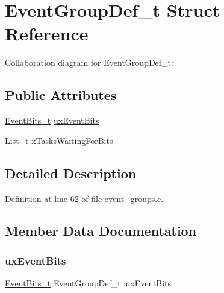 \hypertarget{struct_event_group_def__t}{}\section{Event\+Group\+Def\+\_\+t Struct Reference}
\label{struct_event_group_def__t}


Collaboration diagram for Event\+Group\+Def\+\_\+t\+:
\subsection*{Public Attributes}
\begin{DoxyCompactItemize}
\item 
\hyperlink{externals_2freertos_2include_2event__groups_8h_ab2f21b93db0b2a0ab64d7a81ff32ac2e}{Event\+Bits\+\_\+t} \hyperlink{struct_event_group_def__t_ab1bcd95a3330b71c55198b2352926643}{ux\+Event\+Bits}
\item 
\hyperlink{externals_2freertos_2include_2list_8h_afd590ef6400071b4d63d65ef90bea7f4}{List\+\_\+t} \hyperlink{struct_event_group_def__t_a3dd347560456bfe452415efb52760dc3}{x\+Tasks\+Waiting\+For\+Bits}
\end{DoxyCompactItemize}


\subsection{Detailed Description}


Definition at line 62 of file event\+\_\+groups.\+c.



\subsection{Member Data Documentation}
\mbox{\label{struct_event_group_def__t_ab1bcd95a3330b71c55198b2352926643}} 
\subsubsection{\texorpdfstring{ux\+Event\+Bits}{uxEventBits}}
{\footnotesize\ttfamily \hyperlink{externals_2freertos_2include_2event__groups_8h_ab2f21b93db0b2a0ab64d7a81ff32ac2e}{Event\+Bits\+\_\+t} Event\+Group\+Def\+\_\+t\+::ux\+Event\+Bits}



